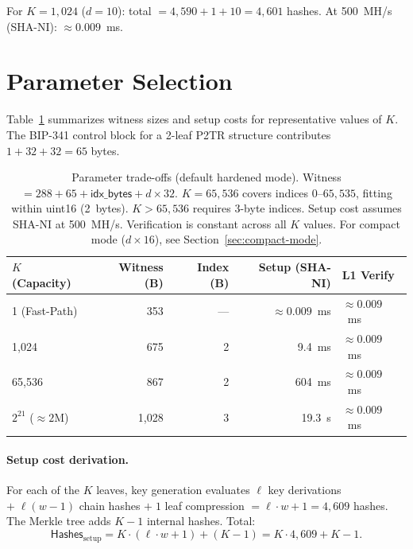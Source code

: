 \documentclass[11pt,a4paper]{article}
\theoremstyle{definition}
\begin{document}
For $K = 1{,}024$ ($d = 10$): total $= 4{,}590 + 1 + 10 = 4{,}601$ hashes. At 500~MH/s (SHA-NI): $\approx 0.009$~ms.

\section{Parameter Selection}
\label{sec:params}

Table~\ref{tab:params} summarizes witness sizes and setup costs for representative values of $K$. The BIP-341 control block for a 2-leaf P2TR structure contributes $1 + 32 + 32 = 65$ bytes.

\begin{table}[h]
\centering
\begin{tabular}{@{}lrrrl@{}}
\toprule
\textbf{$K$ (Capacity)} & \textbf{Witness (B)} & \textbf{Index (B)} & \textbf{Setup (SHA-NI)} & \textbf{L1 Verify} \\
\midrule
1 (Fast-Path) & 353 & --- & $\approx 0.009$~ms & $\approx 0.009$~ms \\
1,024 & 675 & 2 & 9.4~ms & $\approx 0.009$~ms \\
65,536 & 867 & 2 & 604~ms & $\approx 0.009$~ms \\
$2^{21}$ ($\approx 2$M) & 1,028 & 3 & 19.3~s & $\approx 0.009$~ms \\
\bottomrule
\end{tabular}
\caption{Parameter trade-offs (default hardened mode). Witness $= 288 + 65 + \mathsf{idx\_bytes} + d \times 32$. $K = 65{,}536$ covers indices $0$--$65{,}535$, fitting within uint16 (2~bytes). $K > 65{,}536$ requires 3-byte indices. Setup cost assumes SHA-NI at 500~MH/s. Verification is constant across all $K$ values. For compact mode ($d \times 16$), see Section~\ref{sec:compact-mode}.}
\label{tab:params}
\end{table}

\paragraph{Setup cost derivation.} For each of the $K$ leaves, key generation evaluates $\ell$ key derivations $+ \;\ell(w-1)$ chain hashes $+ \;1$ leaf compression $= \ell \cdot w + 1 = 4{,}609$ hashes. The Merkle tree adds $K - 1$ internal hashes. Total:
$$
\mathsf{Hashes}_{\mathrm{setup}} = K \cdot (\ell \cdot w + 1) + (K - 1) = K \cdot 4{,}609 + K - 1.
$$
\end{document}
